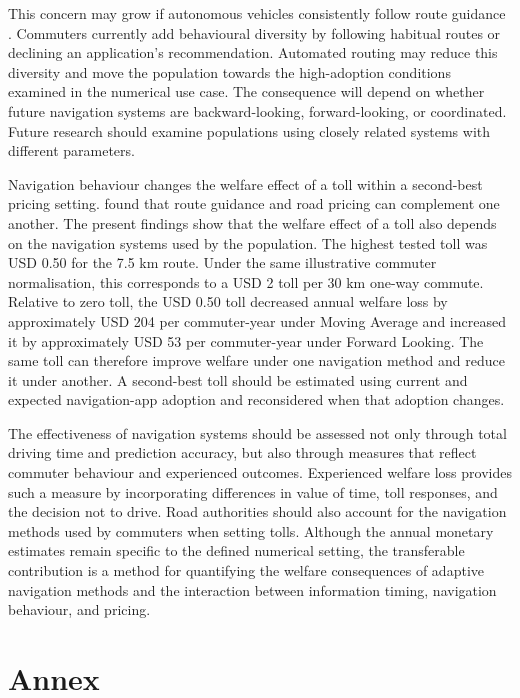 \documentclass{article}
\begin{document}
This concern may grow if autonomous vehicles consistently follow route guidance \parencite{lentzakisEtAl2018}. Commuters currently add behavioural diversity by following habitual routes or declining an application’s recommendation. Automated routing may reduce this diversity and move the population towards the high-adoption conditions examined in the numerical use case. The consequence will depend on whether future navigation systems are backward-looking, forward-looking, or coordinated. Future research should examine populations using closely related systems with different parameters.

Navigation behaviour changes the welfare effect of a toll within a second-best pricing setting. \Textcite{yang1999} found that route guidance and road pricing can complement one another. The present findings show that the welfare effect of a toll also depends on the navigation systems used by the population. The highest tested toll was USD 0.50 for the 7.5 km route. Under the same illustrative commuter normalisation, this corresponds to a USD 2 toll per 30 km one-way commute. Relative to zero toll, the USD 0.50 toll decreased annual welfare loss by approximately USD 204 per commuter-year under Moving Average and increased it by approximately USD 53 per commuter-year under Forward Looking. The same toll can therefore improve welfare under one navigation method and reduce it under another. A second-best toll should be estimated using current and expected navigation-app adoption and reconsidered when that adoption changes.

\enlargethispage{\baselineskip}
The effectiveness of navigation systems should be assessed not only through total driving time and prediction accuracy, but also through measures that reflect commuter behaviour and experienced outcomes. Experienced welfare loss provides such a measure by incorporating differences in value of time, toll responses, and the decision not to drive. Road authorities should also account for the navigation methods used by commuters when setting tolls. Although the annual monetary estimates remain specific to the defined numerical setting, the transferable contribution is a method for quantifying the welfare consequences of adaptive navigation methods and the interaction between information timing, navigation behaviour, and pricing.

\clearpage
\appendix
\renewcommand{\thetable}{A.\arabic{table}}
\renewcommand{\thefigure}{A.\arabic{figure}}
\setcounter{table}{0}
\setcounter{figure}{0}
\section{Annex}
\end{document}
